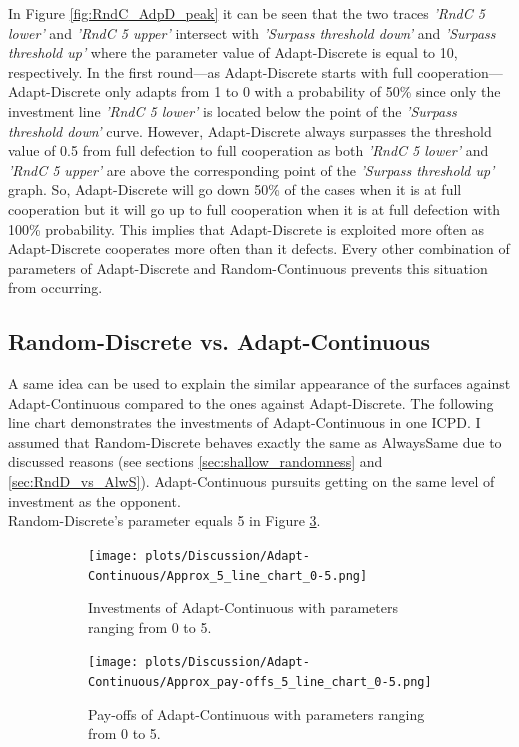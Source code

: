 \documentclass[11pt]{article}
\begin{document}
	\noindent
	In Figure \ref{fig:RndC_AdpD_peak} it can be seen that the two traces \textit{'RndC 5 lower'} and \textit{'RndC 5 upper'} intersect with \textit{'Surpass threshold down'} and \textit{'Surpass threshold up'} where the parameter value of Adapt-Discrete is equal to 10, respectively.
	In the first round---as Adapt-Discrete starts with full cooperation---Adapt-Discrete only adapts from 1 to 0 with a probability of 50\% since only the investment line \textit{'RndC 5 lower'} is located below the point of the \textit{'Surpass threshold down'} curve.
	However, Adapt-Discrete always surpasses the threshold value of 0.5 from full defection to full cooperation as both \textit{'RndC 5 lower'} and \textit{'RndC 5 upper'} are above the corresponding point of the \textit{'Surpass threshold up'} graph.
	So, Adapt-Discrete will go down 50\% of the cases when it is at full cooperation but it will go up to full cooperation when it is at full defection with 100\% probability.
	This implies that Adapt-Discrete is exploited more often as Adapt-Discrete cooperates more often than it defects.
	Every other combination of parameters of Adapt-Discrete and Random-Continuous prevents this situation from occurring.

\subsection{Random-Discrete vs. Adapt-Continuous}
	A same idea can be used to explain the similar appearance of the surfaces against Adapt-Continuous compared to the ones against Adapt-Discrete.
	The following line chart demonstrates the investments of Adapt-Continuous in one ICPD.
	I assumed that Random-Discrete behaves exactly the same as AlwaysSame due to discussed reasons (see sections \ref{sec:shallow_randomness} and \ref{sec:RndD_vs_AlwS}).
	Adapt-Continuous pursuits getting on the same level of investment as the opponent.\\
	Random-Discrete's parameter equals 5 in Figure \ref{fig:AdpC_approx_invetm_and_payoffs_0-5}.\\
	\begin{figure}[h!]
		\centering
		\begin{subfigure}[t]{0.45\textwidth}
			\centering
			\texttt{[image: plots/Discussion/Adapt-Continuous/Approx\_5\_line\_chart\_0-5.png]}\\
			\caption{Investments of Adapt-Continuous with parameters ranging from 0 to 5.}
			\label{fig:AdpC_approx_investm_0-5}
		\end{subfigure}
		\hfill
		\begin{subfigure}[t]{0.45\textwidth}
			\centering
			\texttt{[image: plots/Discussion/Adapt-Continuous/Approx\_pay-offs\_5\_line\_chart\_0-5.png]}
			\caption{Pay-offs of Adapt-Continuous with parameters ranging from 0 to 5.}
			\label{fig:AdpC_approx_payoff_0-5}
		\end{subfigure}
		\caption{}
		\label{fig:AdpC_approx_invetm_and_payoffs_0-5}
	\end{figure}
\end{document}
